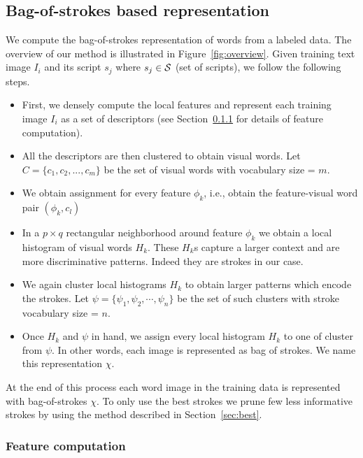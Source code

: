 \subsection{Bag-of-strokes based representation}
\label{sec:bos}
We compute the bag-of-strokes representation of words from a labeled data. The  overview of our method is illustrated in Figure~\ref{fig:overview}. Given training text image $I_i$ and its script $s_j$ where $s_j \in {\cal S}$ (set of scripts), we follow the following steps.
\begin{itemize}
\item First, we densely compute the local features and represent each training image $I_i$ 
as a set of descriptors (see Section~\ref{sec:features} for details of feature computation).
\item All the descriptors are then clustered to obtain visual words. Let $C = \{c_1,c_2,...,c_m\}$ be the set of visual words with vocabulary size = $m$. 
\item We obtain assignment for every feature $\phi_k$, i.e., obtain the feature-visual word pair $(\phi_k, c_l)$
\item In a $p \times q$ rectangular neighborhood around feature $\phi_k$ we obtain a local histogram of visual words $H_k$. These $H_k$s capture a larger context and are
more discriminative patterns. Indeed they are strokes in our case. 
\item We again cluster local histograms $H_k$ to obtain larger patterns which encode the
strokes. Let $\psi = \{\psi_1, \psi_2, \cdots ,\psi_n\}$ be the set of such clusters with stroke vocabulary size = $n$.
\item Once $H_k$ and $\psi$ in hand, we assign every local histogram $H_k$ to one of cluster from $\psi$. In other words, each image is represented as bag of strokes. We
name this representation $\chi$.
\end{itemize}  
At the end of this process each word image in the training data is represented with bag-of-strokes $\chi$. To only use the best strokes we prune few less informative strokes by using the method described in Section~\ref{sec:best}.

\subsubsection{Feature computation}
\label{sec:features}

